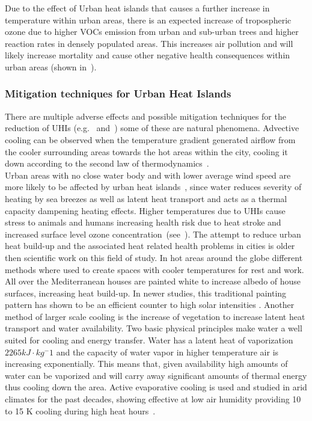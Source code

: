 \documentclass[12pt,a4paper, english,twoside]{article}
\begin{document}
      Due to the effect of Urban heat islands that causes a further increase in temperature within urban areas, there is an expected increase of tropospheric ozone due to higher \glspl{VOC} emission from urban and sub-urban trees and higher reaction rates in densely populated areas. 
      This increases air pollution and will likely increase mortality and cause other negative health consequences within urban areas (shown in~\cite{Ebi2008}).\\ 
    \subsubsection{Mitigation techniques for Urban Heat Islands}\label{ssec:mitigation}
      There are multiple adverse effects and possible mitigation techniques for the reduction of \glspl{UHI} (e.g.~\cite{Nichol1994} and~\cite{Stewart2011}) some of these are natural phenomena. %
      Advective cooling can be observed when the temperature gradient generated airflow from the cooler surrounding areas towards the hot areas within the city, cooling it down according to the second law of thermodynamics~\autocite{HaegerEugensson1999}. \\
      Urban areas with no close water body  and with lower average wind speed are more likely to be affected by urban heat islands~\autocite{Ramamurthy2017}, since water reduces severity of heating by sea breezes as well as latent heat transport and acts as a thermal capacity dampening heating effects. 
      Higher temperatures due to \glspl{UHI} cause stress to animals and humans increasing health risk due to heat stroke and increased surface level ozone concentration~(see~\cite{Santamouris2020}).%
      The attempt to reduce urban heat build-up and the associated heat related health problems in cities is older then scientific work on this field of study. 
      In hot areas around the globe different methods where used to create spaces with cooler temperatures for rest and work. 
      All over the Mediterranean houses are painted white to increase albedo of house surfaces, increasing heat build-up. 
      In newer studies, this traditional painting pattern has shown to be an efficient counter to high solar intensities \autocite{Fayad2021}.
      Another method of larger scale cooling is the increase of vegetation to increase latent heat transport and water availability.
      Two basic physical principles make water a well suited for cooling and energy transfer.
      Water has a latent heat of vaporization $2265 kJ\cdot kg^-1$ and the capacity of water vapor in higher temperature air is increasing exponentially.
      This means that, given availability high amounts of water can be vaporized and will carry away significant amounts of thermal energy thus cooling down the area. 
      Active evaporative cooling is used and studied in arid climates for the past decades, showing effective at low air humidity providing 10 to 15 K cooling during high heat hours~\autocite{Vanos2022}.
\end{document}
